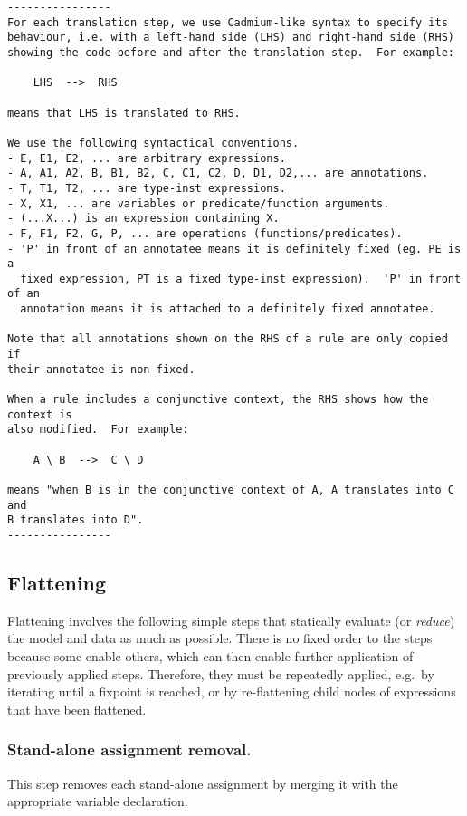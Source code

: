 \documentclass[10pt]{article}
\begin{document}
\begin{verbatim}
----------------
For each translation step, we use Cadmium-like syntax to specify its
behaviour, i.e. with a left-hand side (LHS) and right-hand side (RHS)
showing the code before and after the translation step.  For example:

    LHS  -->  RHS

means that LHS is translated to RHS.

We use the following syntactical conventions.
- E, E1, E2, ... are arbitrary expressions.
- A, A1, A2, B, B1, B2, C, C1, C2, D, D1, D2,... are annotations.
- T, T1, T2, ... are type-inst expressions.
- X, X1, ... are variables or predicate/function arguments.
- (...X...) is an expression containing X.
- F, F1, F2, G, P, ... are operations (functions/predicates).
- 'P' in front of an annotatee means it is definitely fixed (eg. PE is a
  fixed expression, PT is a fixed type-inst expression).  'P' in front of an
  annotation means it is attached to a definitely fixed annotatee.

Note that all annotations shown on the RHS of a rule are only copied if
their annotatee is non-fixed.

When a rule includes a conjunctive context, the RHS shows how the context is
also modified.  For example:

    A \ B  -->  C \ D

means "when B is in the conjunctive context of A, A translates into C and
B translates into D".
----------------
\end{verbatim}


\subsection{Flattening}
Flattening involves the following simple steps that statically evaluate (or
\emph{reduce}) the model and data as much as possible.  There is no fixed
order to the steps because some enable others, which can then enable further
application of previously applied steps.  Therefore, they must be repeatedly
applied, e.g.~by iterating until a fixpoint is reached, or by re-flattening
child nodes of expressions that have been flattened.

\subsubsection{Stand-alone assignment removal.}
This step removes each stand-alone assignment by merging it with the
appropriate variable declaration.
\end{document}
